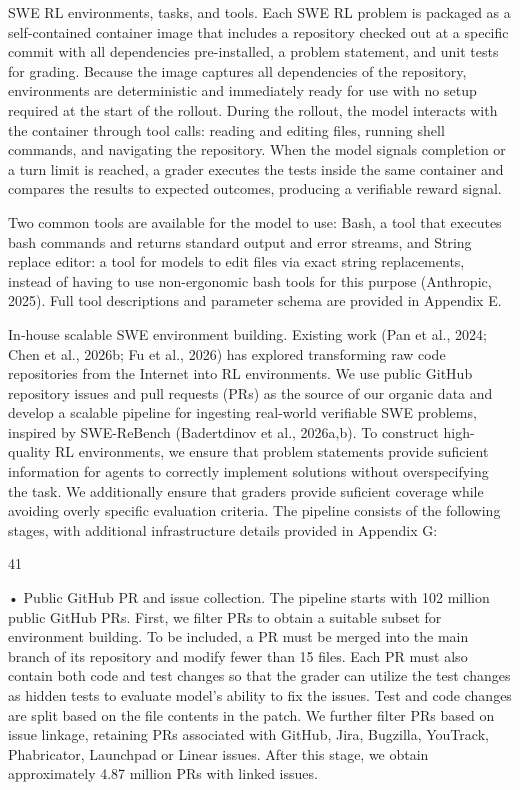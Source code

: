 \documentclass[
  10
]{article}
\begin{document}
SWE RL environments, tasks, and tools. Each SWE RL problem is packaged
as a self-contained container image that includes a repository checked
out at a specific commit with all dependencies pre-installed, a problem
statement, and unit tests for grading. Because the image captures all
dependencies of the repository, environments are deterministic and
immediately ready for use with no setup required at the start of the
rollout. During the rollout, the model interacts with the container
through tool calls: reading and editing files, running shell commands,
and navigating the repository. When the model signals completion or a
turn limit is reached, a grader executes the tests inside the same
container and compares the results to expected outcomes, producing a
verifiable reward signal.

Two common tools are available for the model to use: Bash, a tool that
executes bash commands and returns standard output and error streams,
and String replace editor: a tool for models to edit files via exact
string replacements, instead of having to use non-ergonomic bash tools
for this purpose (Anthropic, 2025). Full tool descriptions and parameter
schema are provided in Appendix E.

In‐house scalable SWE environment building. Existing work (Pan et al.,
2024; Chen et al., 2026b; Fu et al., 2026) has explored transforming raw
code repositories from the Internet into RL environments. We use public
GitHub repository issues and pull requests (PRs) as the source of our
organic data and develop a scalable pipeline for ingesting real-world
verifiable SWE problems, inspired by SWE-ReBench (Badertdinov et al.,
2026a,b). To construct high-quality RL environments, we ensure that
problem statements provide suficient information for agents to correctly
implement solutions without overspecifying the task. We additionally
ensure that graders provide suficient coverage while avoiding overly
specific evaluation criteria. The pipeline consists of the following
stages, with additional infrastructure details provided in Appendix G:

41

• Public GitHub PR and issue collection. The pipeline starts with 102
million public GitHub PRs. First, we filter PRs to obtain a suitable
subset for environment building. To be included, a PR must be merged
into the main branch of its repository and modify fewer than 15 files.
Each PR must also contain both code and test changes so that the grader
can utilize the test changes as hidden tests to evaluate model's ability
to fix the issues. Test and code changes are split based on the file
contents in the patch. We further filter PRs based on issue linkage,
retaining PRs associated with GitHub, Jira, Bugzilla, YouTrack,
Phabricator, Launchpad or Linear issues. After this stage, we obtain
approximately 4.87 million PRs with linked issues.
\end{document}
